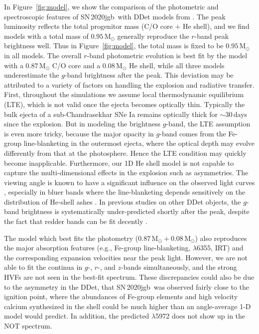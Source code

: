 \documentclass[twocolumn]{aastex631}
\newcommand{\sn}{SN\,2020jgb}
\begin{document}
In Figure~\ref{fig:model}, we show the comparison of the photometric and spectroscopic features of \sn\ with DDet models from \citet{polin_observational_2019}. The peak luminosity reflects the total progenitor mass (C/O core $+$ He shell), and we find models with a total mass of $0.95\,\mathrm{M_\odot}$ generally reproduce the $r$-band peak brightness well. Thus in Figure~\ref{fig:model}, the total mass is fixed to be $0.95\,\mathrm{M_\odot}$ in all models. The overall $r$-band photometric evolution is best fit by the model with a $0.87\,\mathrm{M_\odot}$ C/O core and a $0.08\,\mathrm{M_\odot}$ He shell, while all three models underestimate the $g$-band brightness after the peak. This deviation may be attributed to a variety of factors on handling the explosion and radiative transfer. First, throughout the simulations we assume local thermodynamic equilibrium (LTE), which is not valid once the ejecta becomes optically thin. Typically the bulk ejecta of a sub-Chandrasekhar SNe Ia remains optically thick for $\sim$30\,days since the explosion. But in modeling the brightness $g$-band, the LTE assumption is even more tricky, because the major opacity in $g$-band comes from the Fe-group line-blanketing in the outermost ejecta, where the optical depth may evolve differently from that at the photosphere. Hence the LTE condition may quickly become inapplicable. Furthermore, our 1D He shell model is not capable to capture the multi-dimensional effects in the explosion such as asymmetries. The viewing angle is known to have a significant influence on the observed light curves \citep{Kromer_DD_2010, Sim_2012, Gronow_2020, Shen_2021}, especially in bluer bands where the line-blanketing depends sensitively on the distribution of He-shell ashes \citep{Shen_2021}. In previous studies on other DDet objects, the $g$-band brightness is systematically under-predicted shortly after the peak, despite the fact that redder bands can be fit decently \citep[e.g.][]{jiang_16jhr_2017,jacobson-galan_16hnk_2020}.

The model which best fits the photometry ($0.87\,\mathrm{M_\odot}+0.08\,\mathrm{M_\odot}$) also reproduces the major absorption features (e.g., Fe-group line-blanketing,  $\lambda$6355,  IRT) and the corresponding expansion velocities near the peak light. 
However, we are not able to fit the continua in $g$-, $r$-, and $z$-bands simultaneously, and the strong  HVFs are not seen in the best-fit spectrum. These discrepancies could also be due to the asymmetry in the DDet, that \sn\ was observed fairly close to the ignition point, where the abundances of Fe-group elements and high velocity calcium synthesized in the shell could be much higher than an angle-average 1-D model would predict.
In addition, the predicted  $\lambda$5972 does not show up in the NOT spectrum.
\end{document}
